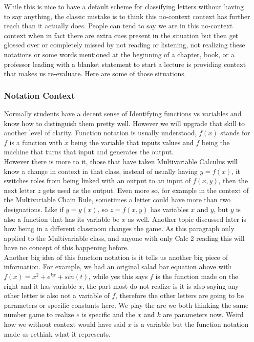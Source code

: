 \documentclass[12pt]{article}
\begin{document}
While this is nice to have a default scheme for classifying letters without having to say anything, the classic mistake is to think this no-context context has further reach than it actually does. People can tend to say we are in this no-context context when in fact there are extra cues present in the situation but then get glossed over or completely missed by not reading or listening, not realizing these notations or some words mentioned at the beginning of a chapter, book, or a professor leading with a blanket statement to start a lecture is providing context that makes us re-evaluate. Here are some of those situations. 

\subsubsection{Notation Context}

Normally students have a decent sense of Identifying functions vs variables and know how to distinguish them pretty well. However we will upgrade that skill to another level of clarity. Function notation is usually understood, $f(x)$ stands for $f$ is a function with $x$ being the variable that inputs values and $f$ being the machine that turns that input and generates the output. \\

However there is more to it, those that have taken Multivariable Calculus will know a change in context in that class, instead of usually having $y=f(x)$, it switches roles from being linked with an output to an input of $f(x,y)$, then the next letter $z$ gets used as the output. Even more so, for example in the context of the Multivariable Chain Rule, sometimes a letter could have more than two designations. Like if $y=y(x)$, so $z=f(x,y)$ has variables $x$ and $y$, but $y$ is also a function that has its variable be $x$ as well. Another topic discussed later is how being in a different classroom changes the game. As this paragraph only applied to the Multivariable class, and anyone with only Calc 2 reading this will have no concept of this happening before. \\

Another big idea of this function notation is it tells us another big piece of information. For example, we had an original salad bar equation above with $f(x)=x^2+e^{kx}+sin(t)$, while yes this says $f$ is the function made on the right and it has variable $x$, the part most do not realize is it is also saying any other letter is also not a variable of $f$, therefore the other letters are going to be parameters or specific constants here. We play the are we both thinking the same number game to realize $e$ is specific and the $x$ and $k$ are parameters now. Weird how we without context would have said $x$ is a variable but the function notation made us rethink what it represents. \\
\end{document}
